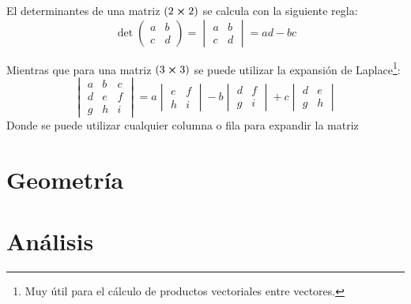 \documentclass[arial,a4paper,print]{article}
\begin{document}
El determinantes de una matriz $(2\cross2)$ se calcula con la siguiente regla:
\begin{equation*}
	\det \begin{pmatrix} a & b \\
		c & d \end{pmatrix} = 
	\begin{vmatrix} a & b \\
		c & d \end{vmatrix} = ad - bc
\end{equation*}

Mientras que para una matriz $(3\cross3)$ se puede utilizar la expansión de Laplace\footnote{Muy útil para el cálculo de productos vectoriales entre vectores.}:
\begin{equation*}
	\begin{vmatrix}a&b&c\\ d&e&f\\ g&h&i\end{vmatrix} =
	a\begin{vmatrix}e&f\\ h&i\end{vmatrix} - b\begin{vmatrix}d&f\\ g&i\end{vmatrix} + c\begin{vmatrix}d&e\\ g&h\end{vmatrix}
\end{equation*}
Donde se puede utilizar cualquier columna o fila para expandir la matriz




\section{Geometría}
\section{Análisis}
\end{document}
